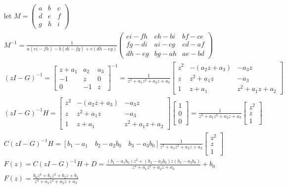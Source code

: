 \begin{align*}
& \textrm{let } M =\begin{pmatrix}a&b&c\\ d&e&f\\ g&h&i \end{pmatrix} \\
& M^{-1}=\frac{1}{a(ei-fh) - b(di-fg) + c(dh-eg)}  \begin{pmatrix} ei-fh&ch-bi&bf-ce\\ fg-di&ai-cg&cd-af\\ dh-eg&bg-ah&ae-bd \end{pmatrix} \\
& (zI-G)^{-1}= \begin{bmatrix}
z+a_1 & a_2 & a_3 \\
-1    & z   & 0   \\
0     & -1  & z 
\end{bmatrix}^{-1} = \frac{1}{z^3+a_1z^2+a_2z+a_3} \begin{bmatrix}
z^2 & -(a_2z+a_3) & -a_3 z \\
z   & z^2+a_1z    &  -a_3  \\
1   & z+a_1       & z^2+a_1z +a_2
\end{bmatrix} \\
& (zI-G)^{-1}H= \begin{bmatrix}
z^2 & -(a_2z+a_3) & -a_3 z \\
z   & z^2+a_1z    &  -a_3  \\
1   & z+a_1       & z^2+a_1z +a_2
\end{bmatrix}\begin{bmatrix}
1 \\ 0 \\ 0
\end{bmatrix} = \frac{1}{z^3+a_1z^2+a_2z+a_3} \begin{bmatrix}
z^2  \\
z    \\
1   
\end{bmatrix} \\
& C(zI-G)^{-1}H = [b_1-a_1 \quad   b_2 - a_2b_0 \quad  b_3 - a_3b_0]\frac{1}{z^3+a_1z^2+a_2z+a_3} \begin{bmatrix}
z^2  \\
z    \\
1   
\end{bmatrix} \\
& F(z) = C(zI-G)^{-1}H +D =  \frac{(b_1-a_1b_0)z^2 + (b_2 - a_2b_0)z (b_3 - a_3b_0)}{z^3+a_1z^2+a_2z+a_3} + b_0 \\
& F(z)= \frac{b_0z^3+b_1z^2+b_2z+b_3}{z^3+a_1z^2+a_2z+a_3}
\end{align*}